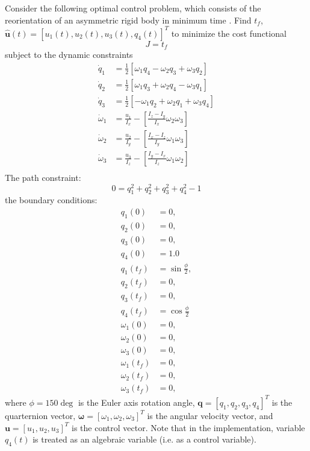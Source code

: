 \documentclass[a4paper,11pt]{report}    %
\begin{document}
Consider the following optimal control problem, which consists of the reorientation of an asymmetric rigid
body in minimum time \cite{Betts:10}.  Find $t_f$, $\hat{\mathbf{u}}(t) = [u_1(t), u_2(t), u_3(t), q_4(t)]^T$
to minimize the cost functional
\begin{equation}
  J = t_f
\end{equation}
subject to the dynamic constraints
\begin{equation}
\begin{aligned}
  \dot q_1 &= \frac{1}{2} \left[ \omega_1 q_4 - \omega_2 q_3 + \omega_3 q_2 \right] \\ 
  \dot q_2 &= \frac{1}{2} \left[ \omega_1 q_3 + \omega_2 q_4 - \omega_3 q_1 \right] \\
  \dot q_3 &= \frac{1}{2} \left[ -\omega_1 q_2 + \omega_2 q_1 + \omega_3 q_4 \right] \\
  \dot \omega_1 &= \frac{u_1}{I_x} - \left[\frac{I_z-I_y}{I_x} \omega_2 \omega_3  \right] \\
  \dot \omega_2 &= \frac{u_2}{I_y} - \left[\frac{I_x-I_z}{I_y} \omega_1 \omega_3  \right] \\
  \dot \omega_3 &= \frac{u_3}{I_z} - \left[\frac{I_y-I_x}{I_z} \omega_1 \omega_2  \right] \\
\end{aligned}
\end{equation}
The path constraint:
\begin{equation}
  0 = q_1^2 + q_2^2 + q_3^2 + q_4^2 - 1 
\end{equation}
the boundary conditions:
\begin{equation}
 \begin{aligned}
    q_1(0)&=0, \\
    q_2(0)&=0, \\
    q_3(0)&=0, \\
    q_4(0)&=1.0  \\  
    q_1(t_f) &=\sin\frac{\phi}{2},\\
    q_2(t_f)&=0, \\
    q_3(t_f)&=0,  \\
    q_4(t_f)&=\cos\frac{\phi}{2}  \\  
    \omega_1(0)&=0,  \\
    \omega_2(0)&=0, \\
    \omega_3(0)&=0,  \\
    \omega_1(t_f)&=0, \\ 
    \omega_2(t_f)&=0, \\
    \omega_3(t_f)&=0, 
 \end{aligned}
\end{equation}
where $\phi=150 \deg$ is the Euler axis rotation angle, $\mathbf{q}=[q_1, q_2, q_3, q_4]^T$ is the
quarternion vector, $\mathbf{\omega} = [\omega_1, \omega_2, \omega_3]^T$ is the angular velocity vector, and $\mathbf{u} = [u_1, u_2, u_3]^T$ is the control vector.
Note that in the implementation, variable $q_4(t)$ is treated as an algebraic variable (i.e. as a control variable).
\end{document}
